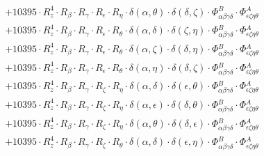 \documentclass{article}
\begin{document}
\begin{equation}
\begin{array}{c}
 \\[0.2em] 		 + 10395 \cdot R_{z}^{4} \cdot R_{\beta{}} \cdot R_{\gamma{}} \cdot R_{\epsilon{}} \cdot R_{\eta{}} \cdot \delta{}\left(\alpha{}, \theta{}\right) \cdot \delta{}\left(\delta{}, \zeta{}\right) \cdot \Phi{}^{B}_{\alpha{}\beta{}\gamma{}\delta{}} \cdot \Phi{}^{A}_{\epsilon{}\zeta{}\eta{}\theta{}} 
 \\[0.2em] 		 + 10395 \cdot R_{z}^{4} \cdot R_{\beta{}} \cdot R_{\gamma{}} \cdot R_{\epsilon{}} \cdot R_{\theta{}} \cdot \delta{}\left(\alpha{}, \delta{}\right) \cdot \delta{}\left(\zeta{}, \eta{}\right) \cdot \Phi{}^{B}_{\alpha{}\beta{}\gamma{}\delta{}} \cdot \Phi{}^{A}_{\epsilon{}\zeta{}\eta{}\theta{}} 
 \\[0.2em] 		 + 10395 \cdot R_{z}^{4} \cdot R_{\beta{}} \cdot R_{\gamma{}} \cdot R_{\epsilon{}} \cdot R_{\theta{}} \cdot \delta{}\left(\alpha{}, \zeta{}\right) \cdot \delta{}\left(\delta{}, \eta{}\right) \cdot \Phi{}^{B}_{\alpha{}\beta{}\gamma{}\delta{}} \cdot \Phi{}^{A}_{\epsilon{}\zeta{}\eta{}\theta{}} 
 \\[0.2em] 		 + 10395 \cdot R_{z}^{4} \cdot R_{\beta{}} \cdot R_{\gamma{}} \cdot R_{\epsilon{}} \cdot R_{\theta{}} \cdot \delta{}\left(\alpha{}, \eta{}\right) \cdot \delta{}\left(\delta{}, \zeta{}\right) \cdot \Phi{}^{B}_{\alpha{}\beta{}\gamma{}\delta{}} \cdot \Phi{}^{A}_{\epsilon{}\zeta{}\eta{}\theta{}} 
 \\[0.2em] 		 + 10395 \cdot R_{z}^{4} \cdot R_{\beta{}} \cdot R_{\gamma{}} \cdot R_{\zeta{}} \cdot R_{\eta{}} \cdot \delta{}\left(\alpha{}, \delta{}\right) \cdot \delta{}\left(\epsilon{}, \theta{}\right) \cdot \Phi{}^{B}_{\alpha{}\beta{}\gamma{}\delta{}} \cdot \Phi{}^{A}_{\epsilon{}\zeta{}\eta{}\theta{}} 
 \\[0.2em] 		 + 10395 \cdot R_{z}^{4} \cdot R_{\beta{}} \cdot R_{\gamma{}} \cdot R_{\zeta{}} \cdot R_{\eta{}} \cdot \delta{}\left(\alpha{}, \epsilon{}\right) \cdot \delta{}\left(\delta{}, \theta{}\right) \cdot \Phi{}^{B}_{\alpha{}\beta{}\gamma{}\delta{}} \cdot \Phi{}^{A}_{\epsilon{}\zeta{}\eta{}\theta{}} 
 \\[0.2em] 		 + 10395 \cdot R_{z}^{4} \cdot R_{\beta{}} \cdot R_{\gamma{}} \cdot R_{\zeta{}} \cdot R_{\eta{}} \cdot \delta{}\left(\alpha{}, \theta{}\right) \cdot \delta{}\left(\delta{}, \epsilon{}\right) \cdot \Phi{}^{B}_{\alpha{}\beta{}\gamma{}\delta{}} \cdot \Phi{}^{A}_{\epsilon{}\zeta{}\eta{}\theta{}} 
 \\[0.2em] 		 + 10395 \cdot R_{z}^{4} \cdot R_{\beta{}} \cdot R_{\gamma{}} \cdot R_{\zeta{}} \cdot R_{\theta{}} \cdot \delta{}\left(\alpha{}, \delta{}\right) \cdot \delta{}\left(\epsilon{}, \eta{}\right) \cdot \Phi{}^{B}_{\alpha{}\beta{}\gamma{}\delta{}} \cdot \Phi{}^{A}_{\epsilon{}\zeta{}\eta{}\theta{}} 

\end{array}
\end{equation}
\end{document}
